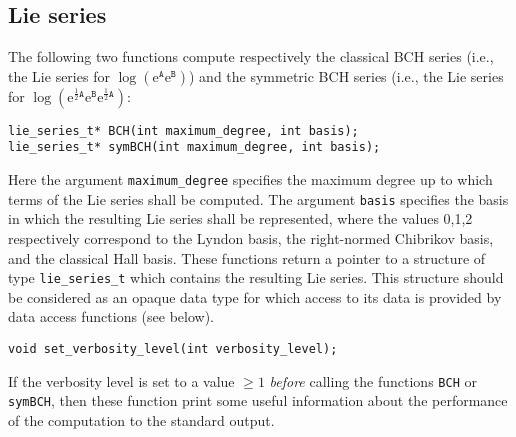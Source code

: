 \documentclass[11pt,a4paper]{article}
\newcommand{\ee}{\mathrm{e}}
\renewcommand{\AA}{\mathtt{A}}
\newcommand{\BB}{\mathtt{B}}
\begin{document}
\subsection{Lie series}
The following two functions compute respectively the classical BCH series
(i.e., the Lie series for $\log(\ee^{\AA}\ee^{\BB})$) and
the symmetric BCH series (i.e., the Lie series for 
$\log(\ee^{\frac{1}{2}\AA}\ee^{\BB}\ee^{\frac{1}{2}\AA})$:
\begin{verbatim}
lie_series_t* BCH(int maximum_degree, int basis);
lie_series_t* symBCH(int maximum_degree, int basis);
\end{verbatim}
Here the argument \verb|maximum_degree| specifies the maximum degree
up to which terms of the Lie series shall be computed. The argument
\verb|basis| specifies the basis in which the resulting Lie series
shall be represented, where the values 0,1,2 respectively correspond to the
Lyndon basis, the right-normed Chibrikov basis, and the classical Hall basis.
These functions return a pointer to a structure of type \verb|lie_series_t| which 
contains the resulting Lie series. 
This structure should be considered as an opaque data type for 
which access to its data is provided by data access functions (see below).



\begin{verbatim}
void set_verbosity_level(int verbosity_level);
\end{verbatim}
If the verbosity level is set to a value $\geq 1$ {\em before} calling
the functions \verb|BCH| or \verb|symBCH|, then these function print
some useful information about the performance of the computation to the standard output.
\end{document}
